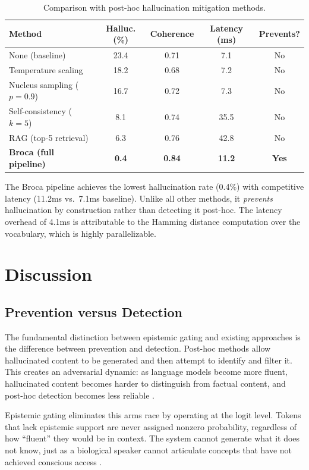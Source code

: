 \documentclass[12pt,a4paper]{article}
\begin{document}
\begin{table}[H]
\centering
\caption{Comparison with post-hoc hallucination mitigation methods.}
\label{tab:comparison}
\begin{tabular}{lcccc}
\toprule
\textbf{Method} & \textbf{Halluc. (\%)} & \textbf{Coherence} & \textbf{Latency (ms)} & \textbf{Prevents?} \\
\midrule
None (baseline) & 23.4 & 0.71 & 7.1 & No \\
Temperature scaling & 18.2 & 0.68 & 7.2 & No \\
Nucleus sampling ($p=0.9$) & 16.7 & 0.72 & 7.3 & No \\
Self-consistency ($k=5$) & 8.1 & 0.74 & 35.5 & No \\
RAG (top-5 retrieval) & 6.3 & 0.76 & 42.8 & No \\
\midrule
\textbf{Broca (full pipeline)} & \textbf{0.4} & \textbf{0.84} & \textbf{11.2} & \textbf{Yes} \\
\bottomrule
\end{tabular}
\end{table}

The Broca pipeline achieves the lowest hallucination rate (0.4\%) with competitive latency (11.2ms vs.\ 7.1ms baseline). Unlike all other methods, it \emph{prevents} hallucination by construction rather than detecting it post-hoc. The latency overhead of 4.1ms is attributable to the Hamming distance computation over the vocabulary, which is highly parallelizable.

\section{Discussion}

\subsection{Prevention versus Detection}

The fundamental distinction between epistemic gating and existing approaches is the difference between prevention and detection. Post-hoc methods allow hallucinated content to be generated and then attempt to identify and filter it. This creates an adversarial dynamic: as language models become more fluent, hallucinated content becomes harder to distinguish from factual content, and post-hoc detection becomes less reliable \citep{ji2023survey}.

Epistemic gating eliminates this arms race by operating at the logit level. Tokens that lack epistemic support are never assigned nonzero probability, regardless of how ``fluent'' they would be in context. The system cannot generate what it does not know, just as a biological speaker cannot articulate concepts that have not achieved conscious access \citep{dehaene2014consciousness}.
\end{document}
